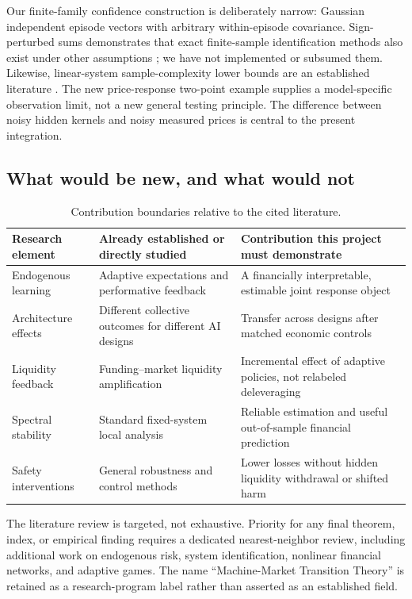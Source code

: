 \documentclass[11pt,a4paper]{article}
\theoremstyle{definition}
\theoremstyle{remark}
\begin{document}
Our finite-family confidence construction is deliberately narrow: Gaussian independent episode vectors with arbitrary within-episode covariance. Sign-perturbed sums demonstrates that exact finite-sample identification methods also exist under other assumptions \citep{csaji2015}; we have not implemented or subsumed them. Likewise, linear-system sample-complexity lower bounds are an established literature \citep{jedra2019}. The new price-response two-point example supplies a model-specific observation limit, not a new general testing principle. The difference between noisy hidden kernels and noisy measured prices is central to the present integration.

\subsection{What would be new, and what would not}
\begin{table}[htbp]
\centering\small
\caption{Contribution boundaries relative to the cited literature.}
\label{tab:novelty}
\begin{tabularx}{\textwidth}{p{}YY}
\toprule
Research element & Already established or directly studied & Contribution this project must demonstrate \\
\midrule
Endogenous learning & Adaptive expectations and performative feedback & A financially interpretable, estimable joint response object \\
Architecture effects & Different collective outcomes for different AI designs & Transfer across designs after matched economic controls \\
Liquidity feedback & Funding--market liquidity amplification & Incremental effect of adaptive policies, not relabeled deleveraging \\
Spectral stability & Standard fixed-system local analysis & Reliable estimation and useful out-of-sample financial prediction \\
Safety interventions & General robustness and control methods & Lower losses without hidden liquidity withdrawal or shifted harm \\
\bottomrule
\end{tabularx}
\end{table}
The literature review is targeted, not exhaustive. Priority for any final theorem, index, or empirical finding requires a dedicated nearest-neighbor review, including additional work on endogenous risk, system identification, nonlinear financial networks, and adaptive games. The name ``Machine-Market Transition Theory'' is retained as a research-program label rather than asserted as an established field.
\end{document}

